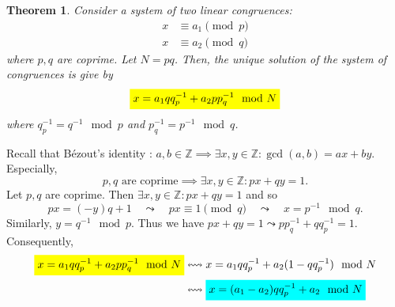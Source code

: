 \documentclass{article}
\newcommand{\mathcolorbox}[2]{\colorbox{#1}{$\displaystyle #2$}}
\newcommand{\inv}[1]{#1^{-1}}
\newtheorem*{theorem*}{Theorem}
\theoremstyle{definition}
\begin{document}

	\begin{tcolorbox}[title=Chinese Remainder Theorem (CRT) - Special Case]
		\begin{theorem*}
			Consider a system of two linear congruences:
			\begin{align*}
			x&\equiv a_1 \pmod{p}\\
			x&\equiv a_2 \pmod{q}
			\end{align*} where $p,q$ are coprime. Let $N=pq$. Then, the unique solution of the system of congruences is give by \begin{align*}
			\mathcolorbox{-blue}{x=a_1qq_p^{-1}+a_2pp_q^{-1}\mod{N}}
			\end{align*} where $q_p^{-1}=\inv{q}\mod{p}$ and $p_{q}^{-1}=\inv{p}\mod{q}$.
		\end{theorem*}
		\tcblower
		Recall that Bézout's identity : $
		a,b\in\mathbb{Z}\implies\exists x,y\in\mathbb{Z}:\gcd(a,b)=ax+by.
		$ Especially, \[
		\text{$p,q$ are coprime}\implies\exists x,y\in\mathbb{Z}: px+qy=1.
		\] Let $p,q$ are coprime. Then $\exists x,y\in\mathbb{Z}:px+qy=1$ and so \[
		px=(-y)q+1\quad\leadsto\quad px\equiv1\pmod{q}\quad\leadsto\quad x=p^{-1}\mod{q}.
		\] Similarly, $y=q^{-1}\mod{p}$. Thus we have $px+qy=1\leadsto pp_{q}^{-1}+qq_{p}^{-1}=1$. Consequently, \begin{align*}
		\mathcolorbox{-blue}{x=a_1qq_p^{-1}+a_2pp_q^{-1}\mod{N}} &\leftrightsquigarrow x=a_1qq_p^{-1}+a_2(1-qq_{p}^{-1})\mod{N}\\
		&\leftrightsquigarrow \mathcolorbox{-red}{x=(a_1-a_2)qq_p^{-1}+a_2\mod{N}}\\
		\end{align*}
	\end{tcolorbox}
	
\end{document}
